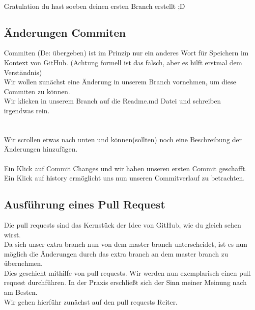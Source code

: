 \documentclass[a4paper,10pt,DIV11,oneside]{scrartcl}
\begin{document}
\\

Gratulation du hast soeben deinen ersten Branch erstellt ;D

\subsection{Änderungen Commiten}
Commiten (De: übergeben) ist im Prinzip nur ein anderes Wort für Speichern im Kontext von GitHub. (Achtung formell ist das falsch, aber es hilft erstmal dem Verständnis)\\

Wir wollen zunächst eine Änderung in unserem Branch vornehmen, um diese Commiten zu können.\\
Wir klicken in unserem Branch auf die Readme.md Datei und schreiben irgendwas rein.\\

\\

\\

Wir scrollen etwas nach unten und können(sollten) noch eine Beschreibung der Änderungen hinzufügen.\\

\\

Ein Klick auf Commit Changes und wir haben unseren ersten Commit geschafft.\\
Ein Klick auf history ermöglicht uns nun unseren Commitverlauf zu betrachten.
\subsection{Ausführung eines Pull Request}
Die pull requests sind das Kernstück der Idee von GitHub, wie du gleich sehen wirst.\\
Da sich unser extra branch nun von dem master branch unterscheidet, ist es nun möglich die Änderungen durch das extra branch an dem master branch zu übernehmen.\\
Dies geschieht mithilfe von pull requests. Wir werden nun exemplarisch einen pull request durchführen. In der Praxis erschließt sich der Sinn meiner Meinung nach am Besten.\\
Wir gehen hierführ zunächst auf den pull requests Reiter.\\
\end{document}
